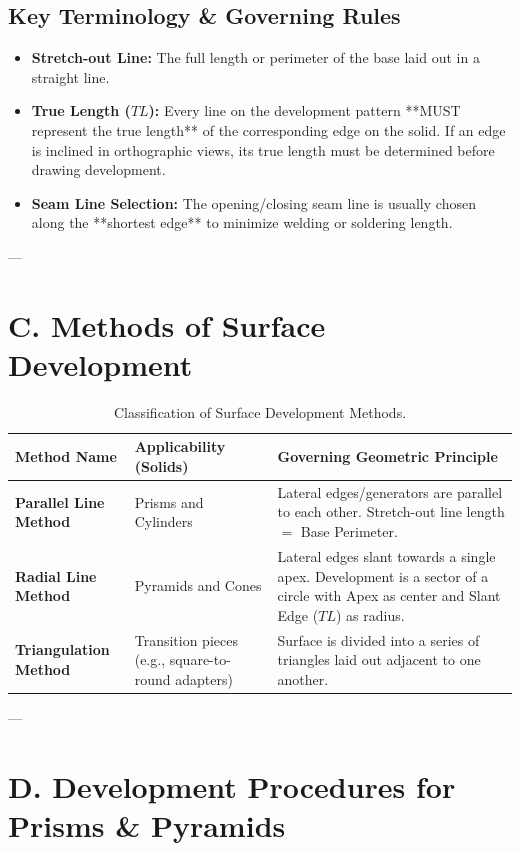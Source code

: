 \subsection{Key Terminology \& Governing Rules}
\begin{itemize}
    \item \textbf{Stretch-out Line:} The full length or perimeter of the base laid out in a straight line.
    \item \textbf{True Length ($TL$):} Every line on the development pattern **MUST represent the true length** of the corresponding edge on the solid. If an edge is inclined in orthographic views, its true length must be determined before drawing development.
    \item \textbf{Seam Line Selection:} The opening/closing seam line is usually chosen along the **shortest edge** to minimize welding or soldering length.
\end{itemize}

---

\section{C. Methods of Surface Development}

\begin{table}[htbp]
\centering
\small
\begin{tabularx}{\textwidth}{l X X}
\toprule
\textbf{Method Name} & \textbf{Applicability (Solids)} & \textbf{Governing Geometric Principle} \\
\midrule
\textbf{Parallel Line Method} & Prisms and Cylinders & Lateral edges/generators are parallel to each other. Stretch-out line length $=$ Base Perimeter. \\
\addlinespace
\textbf{Radial Line Method} & Pyramids and Cones & Lateral edges slant towards a single apex. Development is a sector of a circle with Apex as center and Slant Edge ($TL$) as radius. \\
\addlinespace
\textbf{Triangulation Method} & Transition pieces (e.g., square-to-round adapters) & Surface is divided into a series of triangles laid out adjacent to one another. \\
\bottomrule
\end{tabularx}
\caption{Classification of Surface Development Methods.}
\label{tab:dev-methods}
\end{table}

---

\section{D. Development Procedures for Prisms \& Pyramids}

